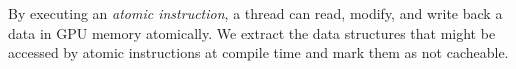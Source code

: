 By executing an {\it atomic instruction}, a thread can read, modify, and write back a data in GPU
memory atomically.
We extract the data structures that might be accessed by atomic instructions at compile time and mark them as not cacheable.




